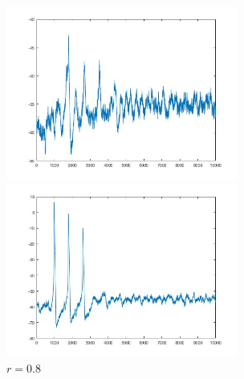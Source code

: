 \documentclass[
bachelor,
nofont, %
pdflinks,
]{xjtuthesis}
\begin{document}
\begin{figure}[!ht]
\begin{minipage}[!ht]{0.5\linewidth}
\centering
\includegraphics[width=3.0in]{p10r0_5_2.jpg}
\caption{$r=0.5$}
\end{minipage}%
\begin{minipage}[!ht]{0.5\linewidth}
\centering
\includegraphics[width=3.0in]{p10r0_8_2.jpg}
\caption{$r=0.8$}
\end{minipage}
\end{figure}
\end{document}
